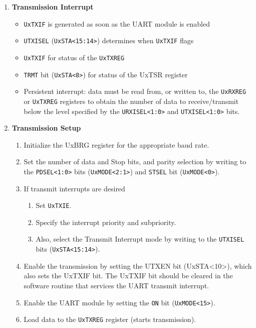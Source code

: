 \documentclass[a4paper]{article}
\begin{document}
\begin{enumerate}[label = \arabic*.]
    \item \textbf{Transmission Interrupt}
      \begin{itemize}[leftmargin = 0.5cm]
        \item \verb|UxTXIF| is generated as soon as the UART module is enabled
        \item \verb|UTXISEL| (\verb|UxSTA<15:14>|) determines when \verb|UxTXIF| flags
        \item \verb|UxTXIF| for status of the \verb|UxTXREG|
        \item \verb|TRMT| bit (\verb|UxSTA<8>|) for status of the UxTSR register
        \item Persistent interrupt: data must be read from, or written to, the \verb|UxRXREG| or \verb|UxTXREG| registers to obtain the number of data to receive/transmit below the level specified by the \verb|URXISEL<1:0>| and \verb|UTXISEL<1:0>| bits.
      \end{itemize}

    \item \textbf{Transmission Setup}
      \begin{enumerate}[label = \arabic*.]
        \item Initialize the UxBRG register for the appropriate baud rate.
        \item Set the number of data and Stop bits, and parity selection by writing to the \verb|PDSEL<1:0>| bits (\verb|UxMODE<2:1>|) and \verb|STSEL| bit (\verb|UxMODE<0>|).
        \item If transmit interrupts are desired
          \begin{enumerate}[label = \arabic*.]
            \item Set \verb|UxTXIE|.
            \item Specify the interrupt priority and subpriority.
            \item Also, select the Transmit Interrupt mode by writing to the \verb|UTXISEL| bits (\verb|UxSTA<15:14>|).
          \end{enumerate}
        \item Enable the transmission by setting the UTXEN bit (UxSTA<10>), which also sets the UxTXIF bit. The UxTXIF bit should be cleared in the software routine that services the UART transmit interrupt.
        \item Enable the UART module by setting the \verb|ON| bit (\verb|UxMODE<15>|).
        \item Load data to the \verb|UxTXREG| register (starts transmission).
      \end{enumerate}


\end{enumerate}
\end{document}
